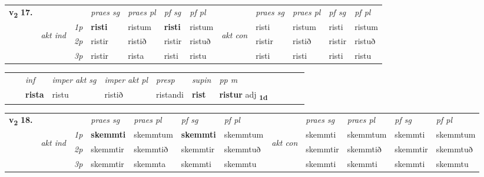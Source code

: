 \begin{tabular}{llllllllllll} \toprule
\multirow{4}{*}{{{\textbf{v{\textsubscript{2}}} \Large{\textbf{17.}}}}}  & &   &  \textit{praes sg}  & \textit{praes pl}  &\textit{ pf sg} & \textit{pf pl} &  &  \textit{praes sg}  & \textit{praes pl}  & \textit{pf sg} & \textit{pf pl } \\*
	\cmidrule{4-7} \cmidrule{9-12}
 & \multirow{3}{*}{\begin{turn}{90}\textit{akt ind}\end{turn}} & {\textit{1p}} & \textbf{risti} & ristum    & \textbf{risti} & ristum & \multirow{3}{*}{\begin{turn}{90}\textit{akt con}\end{turn}} &risti & ristum & risti & ristum\\*
& &  {\textit{2p}} &  ristir  & ristið   & ristir & ristuð & & ristir & ristið & ristir & ristuð \\*
& &  {\textit{3p}} & ristir & rista   & risti & ristu & & risti & risti& risti & ristu  \\*
\cmidrule{4-7} \cmidrule{9-12}
\end{tabular}


\begin{tabular}{llllllllllll}
 & & \textit{inf} & \textit{imper akt sg} & \textit{imper akt pl}   & \textit{presp} & \textit{supin}  & \textit{pp m}     \\*
  & & \textbf{rista} & ristu  & ristið   & ristandi &  \textbf{rist}  & \textbf{ristur} adj \textbf{\textsubscript{1d}} \\*
\cmidrule{1-12}
\end{tabular}



\begin{tabular}{llllllllllll} \toprule
\multirow{4}{*}{{{\textbf{v{\textsubscript{2}}} \Large{\textbf{18.}}}}}  & &   &  \textit{praes sg}  & \textit{praes pl}  &\textit{ pf sg} & \textit{pf pl} &  &  \textit{praes sg}  & \textit{praes pl}  & \textit{pf sg} & \textit{pf pl } \\*
	\cmidrule{4-7} \cmidrule{9-12}
 & \multirow{3}{*}{\begin{turn}{90}\textit{akt ind}\end{turn}} & {\textit{1p}} & \textbf{skemmti} & skemmtum    & \textbf{skemmti} & skemmtum & \multirow{3}{*}{\begin{turn}{90}\textit{akt con}\end{turn}} &skemmti & skemmtum & skemmti & skemmtum\\*
& &  {\textit{2p}} &  skemmtir  & skemmtið   & skemmtir & skemmtuð & & skemmtir & skemmtið & skemmtir & skemmtuð \\*
& &  {\textit{3p}} & skemmtir & skemmta   & skemmti & skemmtu & & skemmti & skemmti& skemmti & skemmtu  \\*
\cmidrule{4-7} \cmidrule{9-12}
\end{tabular}


